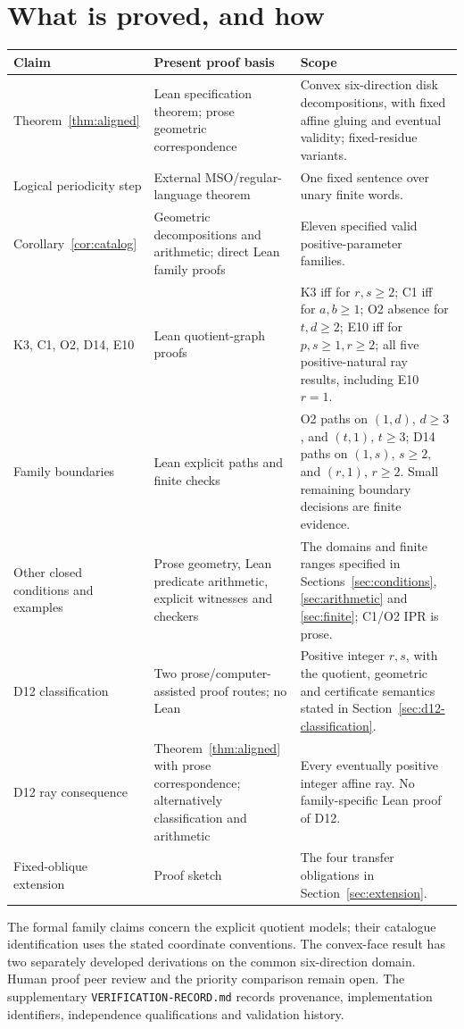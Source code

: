 \documentclass[11pt]{amsart}
\newcommand{\record}[1]{\nolinkurl{#1}}
\theoremstyle{definition}\newtheorem{definition}{Definition}
\begin{document}
\section{What is proved, and how}\label{sec:guarantees}
\begin{center}\small
\begin{tabular}{p{}p{}p{}}
\toprule Claim & Present proof basis & Scope\\\midrule
Theorem~\ref{thm:aligned} & Lean specification theorem; prose geometric correspondence & Convex six-direction disk decompositions, with fixed affine gluing and eventual validity; fixed-residue variants.\\
Logical periodicity step & External MSO/regular-language theorem & One fixed sentence over unary finite words.\\
Corollary~\ref{cor:catalog} & Geometric decompositions and arithmetic; direct Lean family proofs & Eleven specified valid positive-parameter families.\\
K3, C1, O2, D14, E10 & Lean quotient-graph proofs & K3 iff for $r,s\ge2$; C1 iff for $a,b\ge1$; O2 absence for $t,d\ge2$; E10 iff for $p,s\ge1,r\ge2$; all five positive-natural ray results, including E10 $r=1$.\\
Family boundaries & Lean explicit paths and finite checks & O2 paths on $(1,d)$, $d\ge3$, and $(t,1)$, $t\ge3$; D14 paths on $(1,s)$, $s\ge2$, and $(r,1)$, $r\ge2$. Small remaining boundary decisions are finite evidence.\\
Other closed conditions and examples & Prose geometry, Lean predicate arithmetic, explicit witnesses and checkers & The domains and finite ranges specified in Sections~\ref{sec:conditions}, \ref{sec:arithmetic} and \ref{sec:finite}; C1/O2 IPR is prose.\\
D12 classification & Two prose/computer-assisted proof routes; no Lean & Positive integer $r,s$, with the quotient, geometric and certificate semantics stated in Section~\ref{sec:d12-classification}.\\
D12 ray consequence & Theorem~\ref{thm:aligned} with prose correspondence; alternatively classification and arithmetic & Every eventually positive integer affine ray. No family-specific Lean proof of D12.\\
Fixed-oblique extension & Proof sketch & The four transfer obligations in Section~\ref{sec:extension}.\\
\bottomrule
\end{tabular}
\end{center}
The formal family claims concern the explicit quotient models; their
catalogue identification uses the stated coordinate conventions.
The convex-face result has two separately developed derivations on
the common six-direction domain. Human proof peer review and the
priority comparison remain open. The supplementary
\record{VERIFICATION-RECORD.md} records provenance, implementation
identifiers, independence qualifications and validation history.
\end{document}
